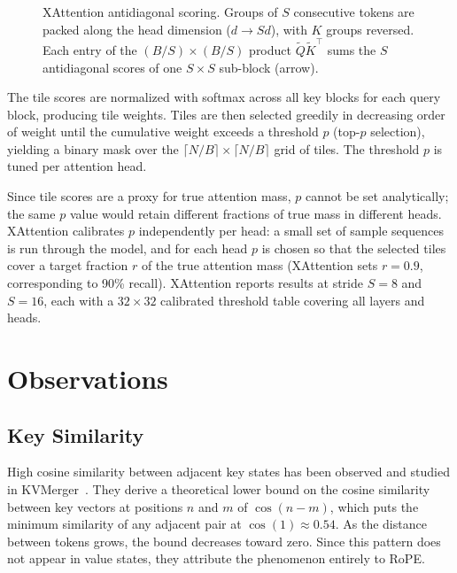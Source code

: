 \begin{figure}[h]
{
}
\caption{XAttention antidiagonal scoring. Groups of $S$ consecutive tokens are packed along the head dimension ($d \to Sd$), with $K$ groups reversed. Each entry of the $(B/S)\times(B/S)$ product $\tilde{Q}\tilde{K}^\top$ sums the $S$ antidiagonal scores of one $S\times S$ sub-block (arrow).}
\label{fig:xattention_antidiag}
\end{figure}

The tile scores are normalized with softmax across all key blocks for each query block, producing tile weights. Tiles are then selected greedily in decreasing order of weight until the cumulative weight exceeds a threshold $p$ (top-$p$ selection), yielding a binary mask over the $\lceil N/B \rceil \times \lceil N/B \rceil$ grid of tiles. The threshold $p$ is tuned per attention head.

Since tile scores are a proxy for true attention mass, $p$ cannot be set analytically; the same $p$ value would retain different fractions of true mass in different heads. XAttention calibrates $p$ independently per head: a small set of sample sequences is run through the model, and for each head $p$ is chosen so that the selected tiles cover a target fraction $r$ of the true attention mass (XAttention sets $r=0.9$, corresponding to 90\% recall). XAttention reports results at stride $S=8$ and $S=16$, each with a $32 \times 32$ calibrated threshold table covering all layers and heads.

\section{Observations}
\label{sec:observations}

\subsection{Key Similarity}

High cosine similarity between adjacent key states has been observed and studied in KVMerger~\citep{wang2024kvmerger}.
They derive a theoretical lower bound on the cosine similarity between key vectors at positions $n$ and $m$ of $\cos(n - m)$, which puts the minimum similarity of any adjacent pair at $\cos(1) \approx 0.54$.
As the distance between tokens grows, the bound decreases toward zero.
Since this pattern does not appear in value states, they attribute the phenomenon entirely to RoPE.

